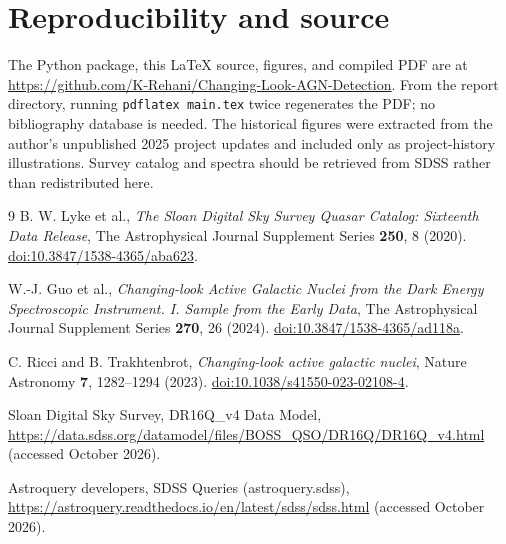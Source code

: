 \documentclass[11pt,a4paper]{article}
\begin{document}
\section*{Reproducibility and source}
The Python package, this \LaTeX{} source, figures, and compiled PDF are at \url{https://github.com/K-Rehani/Changing-Look-AGN-Detection}. From the report directory, running \texttt{pdflatex main.tex} twice regenerates the PDF; no bibliography database is needed. The historical figures were extracted from the author's unpublished 2025 project updates and included only as project-history illustrations. Survey catalog and spectra should be retrieved from SDSS rather than redistributed here.

\begingroup
\small
\raggedright
\begin{thebibliography}{9}
B. W. Lyke et al., \emph{The Sloan Digital Sky Survey Quasar Catalog: Sixteenth Data Release}, The Astrophysical Journal Supplement Series \textbf{250}, 8 (2020). \href{https://doi.org/10.3847/1538-4365/aba623}{doi:10.3847/1538-4365/aba623}.

W.-J. Guo et al., \emph{Changing-look Active Galactic Nuclei from the Dark Energy Spectroscopic Instrument. I. Sample from the Early Data}, The Astrophysical Journal Supplement Series \textbf{270}, 26 (2024). \href{https://doi.org/10.3847/1538-4365/ad118a}{doi:10.3847/1538-4365/ad118a}.

C. Ricci and B. Trakhtenbrot, \emph{Changing-look active galactic nuclei}, Nature Astronomy \textbf{7}, 1282--1294 (2023). \href{https://doi.org/10.1038/s41550-023-02108-4}{doi:10.1038/s41550-023-02108-4}.

Sloan Digital Sky Survey, DR16Q\_v4 Data Model, \url{https://data.sdss.org/datamodel/files/BOSS_QSO/DR16Q/DR16Q_v4.html} (accessed October 2026).

Astroquery developers, SDSS Queries (astroquery.sdss), \url{https://astroquery.readthedocs.io/en/latest/sdss/sdss.html} (accessed October 2026).
\end{thebibliography}
\endgroup
\end{document}
